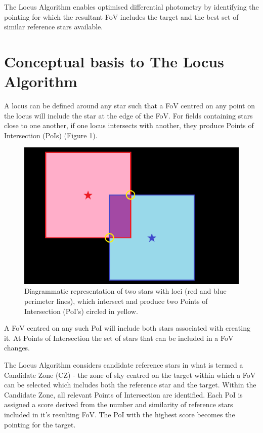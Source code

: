 \documentclass[]{elsarticle} %
\makeatletter
\def\maxwidth{\ifdim\Gin@nat@width>\linewidth\linewidth
\else\Gin@nat@width\fi}
\let\Oldincludegraphics\includegraphics
\renewcommand{\includegraphics}[1]{\Oldincludegraphics[width=\maxwidth]{#1}}
\makeatother
\begin{document}
The Locus Algorithm enables optimised differential photometry by
identifying the pointing for which the resultant FoV includes the target
and the best set of similar reference stars available.

\hypertarget{conceptual-basis-to-the-locus-algorithm}{%
\section{Conceptual basis to The Locus
Algorithm}\label{conceptual-basis-to-the-locus-algorithm}}

A locus can be defined around any star such that a FoV centred on any
point on the locus will include the star at the edge of the FoV. For
fields containing stars close to one another, if one locus intersects
with another, they produce Points of Intersection (PoIs) (Figure 1).

\begin{figure}
\centering
\includegraphics{fig1.png}
\caption{Diagrammatic representation of two stars with loci
(red and blue perimeter lines), which intersect and produce two Points
of Intersection (PoI's) circled in yellow.}
\end{figure}

A FoV centred on any such PoI will include both stars associated with
creating it. At Points of Intersection the set of stars that can be
included in a FoV changes.

The Locus Algorithm considers candidate reference stars in what is
termed a Candidate Zone (CZ) - the zone of sky centred on the target
within which a FoV can be selected which includes both the reference
star and the target. Within the Candidate Zone, all relevant Points of
Intersection are identified. Each PoI is assigned a score derived from
the number and similarity of reference stars included in it's resulting
FoV. The PoI with the highest score becomes the pointing for the target.
\end{document}
